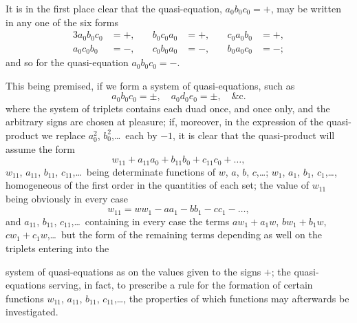 \documentclass[11pt]{article}
\begin{document}
It is in the first place clear that the quasi-equation, $a_0 b_0 c_0 = +$, may be written in any one of the six forms
\begin{alignat*}{3}
a_0 b_0 c_0 &= +, \quad& b_0 c_0 a_0 &= +, \quad& c_0 a_0 b_0 &= +,\\
a_0 c_0 b_0 &= -, \quad& c_0 b_0 a_0 &= -, \quad& b_0 a_0 c_0 &= -;
\end{alignat*}
and so for the quasi-equation $a_0 b_0 c_0 = -$.

\newpage
\setcounter{page}{50}

This being premised, if we form a system of quasi-equations, such as
\[
a_0 b_0 c_0 = \pm, \quad a_0 d_0 e_0 = \pm, \quad \&\text{c.}
\]
where the system of triplets contains each duad once, and once only, and the arbitrary signs are chosen at pleasure; if, moreover, in the expression of the quasi-product we replace $a_0^2$, $b_0^2$,\ldots\ each by $-1$, it is clear that the quasi-product will assume the form
\[
w_{11} + a_{11}a_0 + b_{11}b_0 + c_{11}c_0 + \ldots,
\]
$w_{11}$, $a_{11}$, $b_{11}$, $c_{11}$,\ldots\ being determinate functions of $w$, $a$, $b$, $c$,\ldots; $w_1$, $a_1$, $b_1$, $c_1$,\ldots, homogeneous of the first order in the quantities of each set; the value of $w_{11}$ being obviously in every case
\[
w_{11} = ww_1 - aa_1 - bb_1 - cc_1 - \ldots,
\]
and $a_{11}$, $b_{11}$, $c_{11}$,\ldots\ containing in every case the terms $aw_1+a_1w$, $bw_1+b_1w$, $cw_1+c_1w$,\ldots\ but the form of the remaining terms depending as well on the triplets entering into the

\newpage
\setcounter{page}{51}

system of quasi-equations as on the values given to the signs $+$; the quasi-equations serving, in fact, to prescribe a rule for the formation of certain functions $w_{11}$, $a_{11}$, $b_{11}$, $c_{11}$,\ldots, the properties of which functions may afterwards be investigated.
\end{document}
